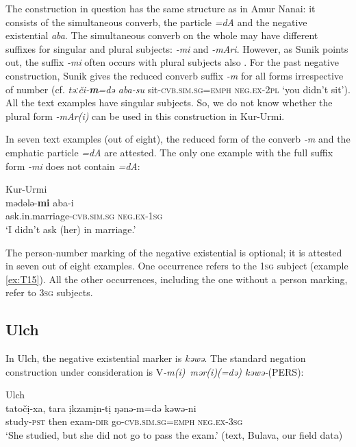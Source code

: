 \documentclass[output=paper]{langscibook}
\begin{document}
The construction in question has the same structure as in Amur Nanai: it consists of the simultaneous converb, the particle \textit{=dA} and the negative existential \textit{aba}. The simultaneous converb on the whole may have different suffixes for singular and plural subjects: \textit{-mi} and \textit{-mAri}. However, as Sunik points out, the suffix \textit{-mi} often occurs with plural subjects also \citep[95]{sunik1958a}. For the past negative construction, Sunik gives the reduced converb suffix \textit{-m} for all forms irrespective of number (cf. \textit{təːči-\textbf{m}=də aba-su} sit-\textsc{cvb.sim.sg=emph} \textsc{neg.ex-2pl} `you didn’t sit'). All the text examples have singular subjects. So, we do not know whether the plural form \textit{-mAr(i)} can be used in this construction in Kur-Urmi.

In seven text examples (out of eight), the reduced form of the converb \textit{‑m} and the emphatic particle \textit{=dA} are attested. The only one example with the full suffix form \textit{-mi} does not contain \textit{=dA}:

\ea Kur-Urmi \label{ex:T15}\\
	\gll mədələ-\textbf{mi}	aba-i\\
	ask.in.marriage-\textsc{cvb.sim.sg}	\textsc{neg.ex-1sg}\\
	\glt `I didn’t ask (her) in marriage.' \citep[127, text]{sunik1958a}
\z

The person-number marking of the negative existential is optional; it is attested in seven out of eight examples. One occurrence refers to the \textsc{1sg} subject (example \ref{ex:T15}). All the other occurrences, including the one without a person marking, refer to \textsc{3sg} subjects.

\subsection{Ulch}\label{sec:T5.4}

In Ulch, the negative existential marker is \textit{kəwə}. The standard negation construction under consideration is V\textit{-m(i)~mər(i)(=də) kəwə-}(PERS):

\ea Ulch \label{ex:T16}\\
	\gll tatočị-xa,	tara	ịkzamịn-tị	ŋənə-m=də	kəwə-ni\\
	study-\textsc{pst}	then	exam-\textsc{dir}	go-\textsc{cvb.sim.sg=emph}	\textsc{neg.ex-3sg}\\
	\glt `She studied, but she did not go to pass the exam.' (text, Bulava, our field data)
\z
\end{document}
